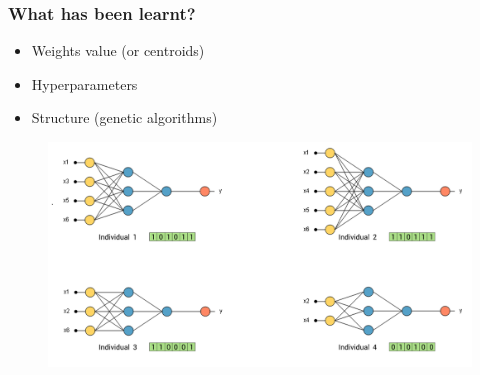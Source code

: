 \begin{frame}
\begin{minipage}{0.48\linewidth}
\begin{figure}[H]
      \end{figure}
   \end{minipage}
\end{frame}

\begin{frame}\frametitle{What has been learnt?}
   \begin{itemize}
      \item Weights value (or centroids)
      \item Hyperparameters
      \item Structure (genetic algorithms)
   \end{itemize}
   \begin{figure}[H]
      \includegraphics[scale=.2]{../images/illustrations/model_genetic_algorithms.png}
   \end{figure}
\end{frame}


